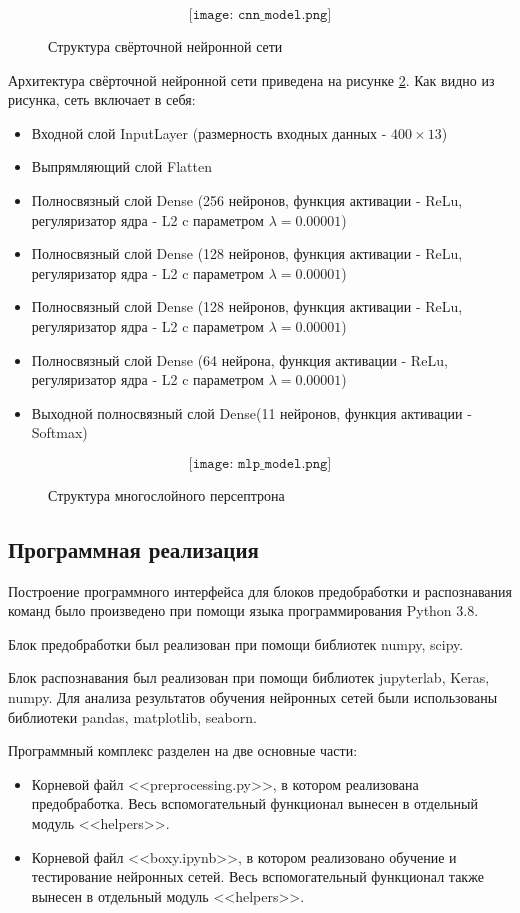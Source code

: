 \begin{figure}[H]
	\[\texttt{[image: cnn\_model.png]}\]
	\caption{Структура свёрточной нейронной сети}
	\label{fig:cnn_model}
\end{figure}

Архитектура свёрточной нейронной сети приведена на рисунке \ref{fig:cnn_model}. Как видно из рисунка, сеть включает в себя:
\begin{itemize}[leftmargin=2cm]
	\item Входной слой InputLayer (размерность входных данных - $400 \times 13$)
	\item Выпрямляющий слой Flatten
	\item Полносвязный слой Dense (256 нейронов, функция активации - ReLu, регуляризатор ядра - L2 c параметром $\lambda = 0.00001$)
	\item Полносвязный слой Dense (128 нейронов, функция активации - ReLu, регуляризатор ядра - L2 c параметром $\lambda = 0.00001$)
	\item Полносвязный слой Dense (128 нейронов, функция активации - ReLu, регуляризатор ядра - L2 c параметром $\lambda = 0.00001$)
	\item Полносвязный слой Dense (64 нейрона, функция активации - ReLu, регуляризатор ядра - L2 c параметром $\lambda = 0.00001$)
	\item Выходной полносвязный слой Dense(11 нейронов, функция активации - Softmax)
\end{itemize}

\begin{figure}[H]
	\[\texttt{[image: mlp\_model.png]}\]
	\caption{Структура многослойного персептрона}
	\label{fig:cnn_model}
\end{figure}

\subsection{Программная реализация}
Построение программного интерфейса для блоков предобработки и распознавания команд было произведено при помощи языка программирования Python 3.8.

Блок предобработки был реализован при помощи библиотек numpy, scipy. 

Блок распознавания был реализован при помощи библиотек jupyterlab, Keras, numpy. Для анализа результатов обучения нейронных сетей были использованы библиотеки pandas, matplotlib, seaborn.

Программный комплекс разделен на две основные части:
\begin{itemize}[leftmargin=2cm]
	\item Корневой файл <<preprocessing.py>>, в котором реализована предобработка. Весь вспомогательный функционал вынесен в отдельный модуль <<helpers>>.
	\item Корневой файл <<boxy.ipynb>>, в котором реализовано обучение и тестирование нейронных сетей. Весь вспомогательный функционал также вынесен в отдельный модуль <<helpers>>.
\end{itemize}

